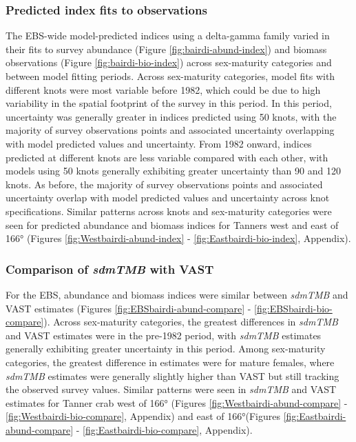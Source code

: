 \documentclass[
]{article}
\begin{document}
\subsubsection*{Predicted index fits to observations}\label{predicted-index-fits-to-observations}

The EBS-wide model-predicted indices using a delta-gamma family varied in their fits to survey abundance (Figure \ref{fig:bairdi-abund-index}) and biomass observations (Figure \ref{fig:bairdi-bio-index}) across sex-maturity categories and between model fitting periods. Across sex-maturity categories, model fits with different knots were most variable before 1982, which could be due to high variability in the spatial footprint of the survey in this period. In this period, uncertainty was generally greater in indices predicted using 50 knots, with the majority of survey observations points and associated uncertainty overlapping with model predicted values and uncertainty. From 1982 onward, indices predicted at different knots are less variable compared with each other, with models using 50 knots generally exhibiting greater uncertainty than 90 and 120 knots. As before, the majority of survey observations points and associated uncertainty overlap with model predicted values and uncertainty across knot specifications. Similar patterns across knots and sex-maturity categories were seen for predicted abundance and biomass indices for Tanners west and east of 166° (Figures \ref{fig:Westbairdi-abund-index} - \ref{fig:Eastbairdi-bio-index}, Appendix).

\subsubsection*{\texorpdfstring{Comparison of \emph{sdmTMB} with VAST}{Comparison of sdmTMB with VAST}}\label{comparison-of-sdmtmb-with-vast}

For the EBS, abundance and biomass indices were similar between \emph{sdmTMB} and VAST estimates (Figures \ref{fig:EBSbairdi-abund-compare} - \ref{fig:EBSbairdi-bio-compare}). Across sex-maturity categories, the greatest differences in \emph{sdmTMB} and VAST estimates were in the pre-1982 period, with \emph{sdmTMB} estimates generally exhibiting greater uncertainty in this period. Among sex-maturity categories, the greatest difference in estimates were for mature females, where \emph{sdmTMB} estimates were generally slightly higher than VAST but still tracking the observed survey values. Similar patterns were seen in \emph{sdmTMB} and VAST estimates for Tanner crab west of 166° (Figures \ref{fig:Westbairdi-abund-compare} - \ref{fig:Westbairdi-bio-compare}, Appendix) and east of 166°(Figures \ref{fig:Eastbairdi-abund-compare} - \ref{fig:Eastbairdi-bio-compare}, Appendix).
\end{document}
